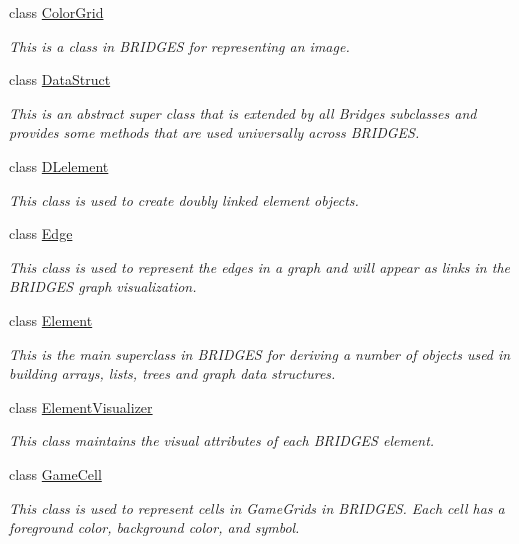 \begin{DoxyCompactItemize}
class \hyperlink{classbridges_1_1base_1_1_color_grid}{Color\+Grid}
\begin{DoxyCompactList}\small\item\em This is a class in B\+R\+I\+D\+G\+ES for representing an image. \end{DoxyCompactList}\item 
class \hyperlink{classbridges_1_1base_1_1_data_struct}{Data\+Struct}
\begin{DoxyCompactList}\small\item\em This is an abstract super class that is extended by all Bridges subclasses and provides some methods that are used universally across B\+R\+I\+D\+G\+ES. \end{DoxyCompactList}\item 
class \hyperlink{classbridges_1_1base_1_1_d_lelement}{D\+Lelement}
\begin{DoxyCompactList}\small\item\em This class is used to create doubly linked element objects. \end{DoxyCompactList}\item 
class \hyperlink{classbridges_1_1base_1_1_edge}{Edge}
\begin{DoxyCompactList}\small\item\em This class is used to represent the edges in a graph and will appear as links in the B\+R\+I\+D\+G\+ES graph visualization. \end{DoxyCompactList}\item 
class \hyperlink{classbridges_1_1base_1_1_element}{Element}
\begin{DoxyCompactList}\small\item\em This is the main superclass in B\+R\+I\+D\+G\+ES for deriving a number of objects used in building arrays, lists, trees and graph data structures. \end{DoxyCompactList}\item 
class \hyperlink{classbridges_1_1base_1_1_element_visualizer}{Element\+Visualizer}
\begin{DoxyCompactList}\small\item\em This class maintains the visual attributes of each B\+R\+I\+D\+G\+ES element. \end{DoxyCompactList}\item 
class \hyperlink{classbridges_1_1base_1_1_game_cell}{Game\+Cell}
\begin{DoxyCompactList}\small\item\em This class is used to represent cells in Game\+Grids in B\+R\+I\+D\+G\+ES. Each cell has a foreground color, background color, and symbol. \end{DoxyCompactList}\item 

\end{DoxyCompactItemize}
